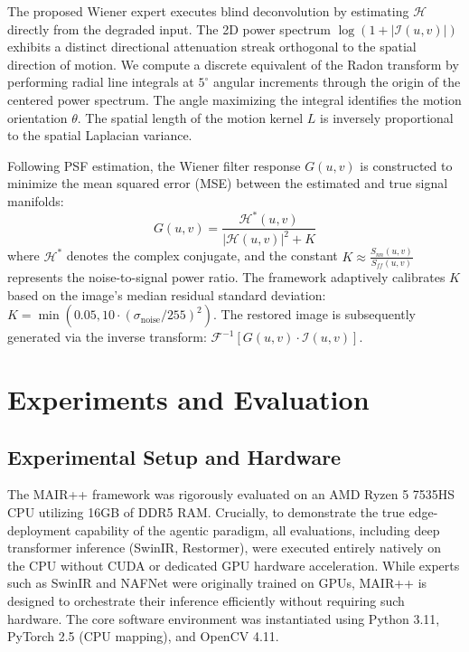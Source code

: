 \documentclass[journal, 10pt]{IEEEtran}
\begin{document}
The proposed Wiener expert executes blind deconvolution by estimating $\mathcal{H}$ directly from the degraded input. The 2D power spectrum $\log(1 + |\mathcal{I}(u,v)|)$ exhibits a distinct directional attenuation streak orthogonal to the spatial direction of motion. We compute a discrete equivalent of the Radon transform by performing radial line integrals at $5^\circ$ angular increments through the origin of the centered power spectrum. The angle maximizing the integral identifies the motion orientation $\theta$. The spatial length of the motion kernel $L$ is inversely proportional to the spatial Laplacian variance. 

Following PSF estimation, the Wiener filter response $G(u,v)$ is constructed to minimize the mean squared error (MSE) between the estimated and true signal manifolds:
\begin{equation} \label{eq:wiener_filter}
    G(u,v) = \frac{\mathcal{H}^*(u,v)}{|\mathcal{H}(u,v)|^2 + K}
\end{equation}
where $\mathcal{H}^*$ denotes the complex conjugate, and the constant $K \approx \frac{S_{nn}(u,v)}{S_{ff}(u,v)}$ represents the noise-to-signal power ratio. The framework adaptively calibrates $K$ based on the image's median residual standard deviation: $K = \min(0.05, 10 \cdot (\sigma_{\text{noise}}/255)^2)$. The restored image is subsequently generated via the inverse transform: $\mathcal{F}^{-1}[G(u,v) \cdot \mathcal{I}(u,v)]$.


\section{Experiments and Evaluation}
\label{sec:experiments}

\subsection{Experimental Setup and Hardware}
The MAIR++ framework was rigorously evaluated on an AMD Ryzen 5 7535HS CPU utilizing 16GB of DDR5 RAM. Crucially, to demonstrate the true edge-deployment capability of the agentic paradigm, all evaluations, including deep transformer inference (SwinIR, Restormer), were executed entirely natively on the CPU without CUDA or dedicated GPU hardware acceleration. While experts such as SwinIR and NAFNet were originally trained on GPUs, MAIR++ is designed to orchestrate their inference efficiently without requiring such hardware. The core software environment was instantiated using Python 3.11, PyTorch 2.5 (CPU mapping), and OpenCV 4.11.
\end{document}
